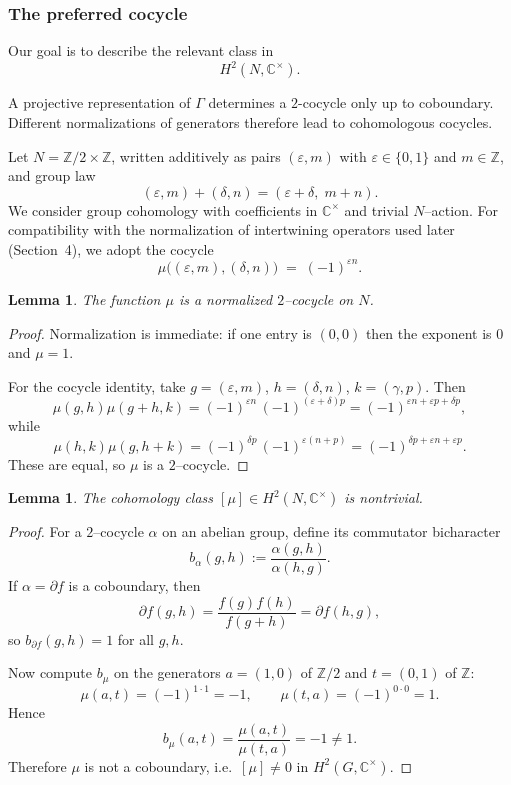 \documentclass[11pt]{amsart}
\newtheorem{lemma}[theorem]{Lemma}
\theoremstyle{remark}
\theoremstyle{definition}
\newcommand{\C}{\mathbb{C}}
\begin{document}
\subsubsection{The preferred cocycle} Our goal is to describe the relevant class in
\[
H^2(N,\C^\times).
\]

A projective representation of $\Gamma$ determines a
$2$-cocycle only up to coboundary.
Different normalizations of generators therefore lead to
cohomologous cocycles.




Let $N=\mathbb Z/2\times \mathbb Z$, written additively as pairs $(\varepsilon,m)$ with
$\varepsilon\in\{0,1\}$ and $m\in\mathbb Z$, and group law
\[
(\varepsilon,m)+(\delta,n)=(\varepsilon+\delta,\;m+n).
\]
We consider group cohomology with coefficients in $\mathbb C^\times$ and trivial $N$--action.  For compatibility with the normalization of intertwining operators
used later (Section~4), we adopt the cocycle
\[
\mu\bigl((\varepsilon,m),(\delta,n)\bigr)
\;=\;
(-1)^{\varepsilon n}.
\]





\begin{lemma}
The function $\mu$ is a normalized $2$--cocycle on $N$.
\end{lemma}

\begin{proof}
Normalization is immediate: if one entry is $(0,0)$ then the exponent is $0$ and $\mu=1$.

For the cocycle identity, take
$g=(\varepsilon,m)$, $h=(\delta,n)$, $k=(\gamma,p)$.
Then
\[
\mu(g,h)\mu(g+h,k)
=
(-1)^{\varepsilon n}\,(-1)^{(\varepsilon+\delta)p}
=
(-1)^{\varepsilon n+\varepsilon p+\delta p},
\]
while
\[
\mu(h,k)\mu(g,h+k)
=
(-1)^{\delta p}\,(-1)^{\varepsilon(n+p)}
=
(-1)^{\delta p+\varepsilon n+\varepsilon p}.
\]
These are equal, so $\mu$ is a $2$--cocycle.
\end{proof}

\begin{lemma}
The cohomology class $[\mu]\in H^2(N,\mathbb C^\times)$ is nontrivial.
\end{lemma}
\begin{proof}
For a $2$--cocycle $\alpha$ on an abelian group, define its commutator bicharacter
\[
b_\alpha(g,h):=\frac{\alpha(g,h)}{\alpha(h,g)}.
\]
If $\alpha=\partial f$ is a coboundary, then
\[
\partial f(g,h)=\frac{f(g)f(h)}{f(g+h)}=\partial f(h,g),
\]
so $b_{\partial f}(g,h)=1$ for all $g,h$.

Now compute $b_\mu$ on the generators $a=(1,0)$ of $\mathbb Z/2$ and $t=(0,1)$ of $\mathbb Z$:
\[
\mu(a,t)=(-1)^{1\cdot 1}=-1,\qquad
\mu(t,a)=(-1)^{0\cdot 0}=1.
\]
Hence
\[
b_\mu(a,t)=\frac{\mu(a,t)}{\mu(t,a)}=-1\neq 1.
\]
Therefore $\mu$ is not a coboundary, i.e.\ $[\mu]\neq 0$ in $H^2(G,\mathbb C^\times)$.
\end{proof}
\end{document}
